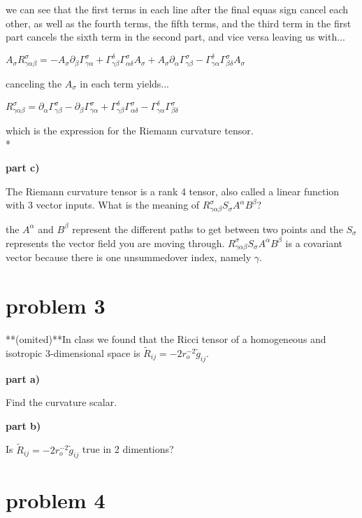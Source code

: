 \documentclass{article}
\begin{document}
we can see that the first terms in each line after the final equas sign cancel each other, as well as the fourth terms, the fifth terms, and the third term in the first part cancels the sixth term in the second part, and vice versa leaving us with...

$A_{\sigma}R^{\sigma}_{\gamma\alpha\beta}=-A_{\sigma}\partial_{\beta}\Gamma^{\sigma}_{\gamma\alpha}+\Gamma^{\delta}_{\gamma\beta}\Gamma^{\sigma}_{\alpha\delta}A_{\sigma}+A_{\sigma}\partial_{\alpha}
\Gamma^{\sigma}_{\gamma\beta}-\Gamma^{\delta}_{\gamma\alpha}\Gamma^{\sigma}_{\beta\delta}A_{\sigma}$

canceling the $A_{\sigma}$ in each term yields...

$R^{\sigma}_{\gamma\alpha\beta}=\partial_{\alpha}
\Gamma^{\sigma}_{\gamma\beta}-\partial_{\beta}\Gamma^{\sigma}_{\gamma\alpha}+\Gamma^{\delta}_{\gamma\beta}\Gamma^{\sigma}_{\alpha\delta}-\Gamma^{\delta}_{\gamma\alpha}\Gamma^{\sigma}_{\beta\delta}$

which is the expression for the Riemann curvature tensor.
\\*

\textbf{part c)}

The Riemann curvature tensor is a rank 4 tensor, also called a linear function with 3 vector inputs. What is the meaning of $R^{\sigma}_{\gamma\alpha\beta}S_{\sigma}A^{\alpha}B^{\beta}$?

 the $A^{\alpha}$ and $B^{\beta}$ represent the different paths to get between two points and the $S_{\sigma}$ represents the vector field you are moving through. $R^{\sigma}_{\gamma\alpha\beta}S_{\sigma}A^{\alpha}B^{\beta}$ is a covariant vector because there is one unsummedover index, namely ${\gamma}$.

\section{problem 3}

\hspace{0.5cm}**(omited)**In class we found that the Ricci tensor of a homogeneous and isotropic 3-dimensional space is $\tilde{R}_{ij}=-2r^{-2}_{o}\tilde{g}_{ij}$.

\textbf{part a)}

Find the curvature scalar.

\textbf{part b)}

Is $\tilde{R}_{ij}=-2r^{-2}_{o}\tilde{g}_{ij}$ true in 2 dimentions?

\section{problem 4}
\end{document}
